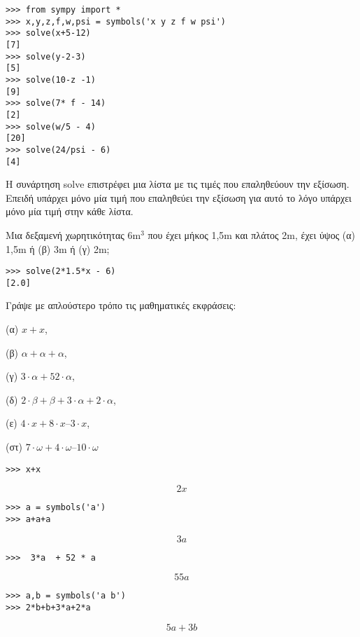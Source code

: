 \begin{lstlisting}
>>> from sympy import *
>>> x,y,z,f,w,psi = symbols('x y z f w psi')
>>> solve(x+5-12)
[7]
>>> solve(y-2-3)
[5]
>>> solve(10-z -1)
[9]
>>> solve(7* f - 14)
[2]
>>> solve(w/5 - 4)
[20]
>>> solve(24/psi - 6)
[4]
\end{lstlisting}
Η συνάρτηση solve επιστρέφει μια λίστα με τις τιμές που επαληθεύουν την εξίσωση. Επειδή υπάρχει μόνο μία τιμή που επαληθεύει την εξίσωση για αυτό το λόγο υπάρχει μόνο μία τιμή στην κάθε λίστα.

\begin{exercise}
Μια δεξαμενή χωρητικότητας 6m$^3$ που έχει μήκος 1,5m και πλάτος 2m, έχει
ύψος (α) 1,5m ή (β) 3m ή (γ) 2m;
\end{exercise}

\begin{lstlisting}
>>> solve(2*1.5*x - 6)
[2.0]
\end{lstlisting}
\begin{exercise}
Γράψε με απλούστερο τρόπο τις μαθηματικές εκφράσεις: 

(α) $x+x$,

(β) $\alpha+\alpha+\alpha$,

(γ) $3\cdot \alpha+52\cdot \alpha$, 

(δ) $2\cdot \beta+\beta+3\cdot \alpha+2\cdot \alpha$, 

(ε) $4\cdot x+8\cdot x–3\cdot x$, 

(στ) $7\cdot \omega+4\cdot \omega–10\cdot \omega$

\end{exercise}

\begin{lstlisting}
>>> x+x
\end{lstlisting}

$$2x$$

\begin{lstlisting}
>>> a = symbols('a')
>>> a+a+a
\end{lstlisting}

$$3a$$

\begin{lstlisting}
>>>  3*a  + 52 * a
\end{lstlisting}

$$55a$$

\begin{lstlisting}
>>> a,b = symbols('a b')
>>> 2*b+b+3*a+2*a 
\end{lstlisting}

$$5a+3b$$

